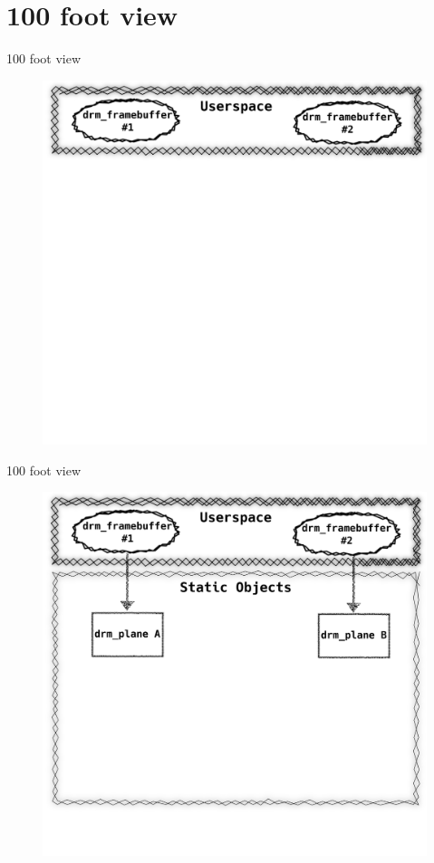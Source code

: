 \documentclass[10pt, compress, aspectratio=169]{beamer}
\begin{document}
\section{100 foot view}
\begin{frame}{100 foot view}
  \begin{figure}
    \centering
    \includegraphics[width=\linewidth,
                     height=0.8\textheight,
                     keepaspectratio]{drm_internals_1}
  \end{figure}
\end{frame}

\begin{frame}{100 foot view}
  \begin{figure}
    \centering
    \includegraphics[width=\linewidth,
                     height=0.8\textheight,
                     keepaspectratio]{drm_internals_2}
  \end{figure}
\end{frame}
\end{document}

